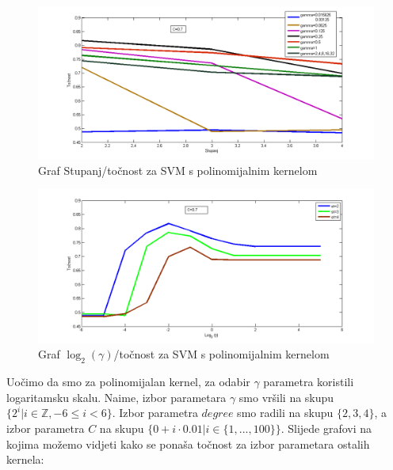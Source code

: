 \documentclass[conference]{IEEEtran}
\begin{document}
\begin{figure}[!ht]
\begin{minipage}{0.5\textwidth}
\centering
\includegraphics[width=\textwidth]{images/paramDegreePoly.png}
\caption{Graf Stupanj/točnost za SVM s polinomijalnim kernelom}
\end{minipage}
\end{figure}

\begin{figure}[!ht]
\begin{minipage}{0.5\textwidth}
\centering
\includegraphics[width=\textwidth]{images/paramGammaPoly.png}
\caption{Graf $\log _2(\gamma )$/točnost za SVM s polinomijalnim kernelom}
\end{minipage}
\end{figure}

Uočimo da smo za polinomijalan kernel, za odabir $\gamma$ parametra koristili logaritamsku skalu. Naime, izbor parametara $\gamma$ smo vršili na skupu $\{2^i| i \in \mathbb{Z}, -6 \leq i <6 \}$.  Izbor parametra $degree$ smo radili na skupu $\{2,3,4\}$, a izbor parametra $C$ na skupu $\{0+i \cdot 0.01 | i \in \{1,...,100\}\}$. Slijede grafovi na kojima možemo vidjeti kako se ponaša točnost za izbor parametara ostalih kernela:
\end{document}
